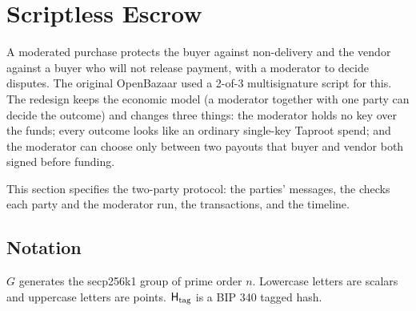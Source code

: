 \section{Scriptless Escrow}
\label{sec:escrow}

A moderated purchase protects the buyer against non-delivery and the vendor against a buyer who will not release payment, with a moderator to decide disputes. The original OpenBazaar used a 2-of-3 multisignature script for this. The redesign keeps the economic model (a moderator together with one party can decide the outcome) and changes three things: the moderator holds no key over the funds; every outcome looks like an ordinary single-key Taproot spend; and the moderator can choose only between two payouts that buyer and vendor both signed before funding.

This section specifies the two-party protocol: the parties' messages, the checks each party and the moderator run, the transactions, and the timeline.

\subsection{Notation}
\label{sec:escrow-notation}

$G$ generates the secp256k1 group of prime order $n$. Lowercase letters are scalars and uppercase letters are points. $\mathsf{H}_{\mathrm{tag}}$ is a BIP 340 tagged hash.

